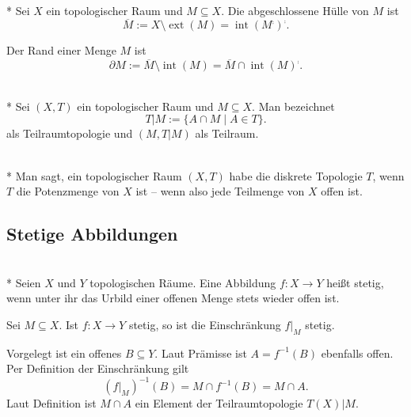 \begin{Definition}\mbox{}\\*
Sei $X$ ein topologischer Raum und $M\subseteq X$. Die abgeschlossene Hülle von $M$ ist%
\[\overline M := X\setminus\operatorname{ext}(M) = \operatorname{int}(M^\comp)^\comp.\]
\end{Definition}

\begin{Definition}[Rand]
Der Rand einer Menge $M$ ist
\[\partial M := \overline M\setminus\operatorname{int}(M)
= \overline M\cap\operatorname{int}(M)^\comp.\]
\end{Definition}

\begin{Definition}[Teilraumtopologie]\mbox{}\\*
Sei $(X,T)$ ein topologischer Raum und $M\subseteq X$. Man bezeichnet
\[T|M := \{A\cap M\mid A\in T\}.\]
als Teilraumtopologie und $(M,T|M)$ als Teilraum.
\end{Definition}

\begin{Definition}\mbox{}\\*
Man sagt, ein topologischer Raum $(X,T)$ habe die diskrete Topologie $T$,
wenn $T$ die Potenzmenge von $X$ ist -- wenn also jede Teilmenge
von $X$ offen ist.
\end{Definition}

\subsection{Stetige Abbildungen}

\begin{Definition}\mbox{}\\*
Seien $X$ und $Y$ topologischen Räume. Eine Abbildung $f\colon X\to Y$
heißt stetig, wenn unter ihr das Urbild einer offenen Menge stets
wieder offen ist.
\end{Definition}

\begin{Korollar}
Sei $M\subseteq X$. Ist $f\colon X\to Y$ stetig, so ist
die Einschränkung $f|_M$ stetig.
\end{Korollar}
\begin{Beweis}
Vorgelegt ist ein offenes $B\subseteq Y$. Laut Prämisse ist $A=f^{-1}(B)$
ebenfalls offen. Per Definition der Einschränkung gilt
\[(f|_M)^{-1}(B) = M\cap f^{-1}(B) = M\cap A.\]
Laut Definition ist $M\cap A$ ein Element der Teilraumtopologie $T(X)|M$.\,\qedsymbol
\end{Beweis}

